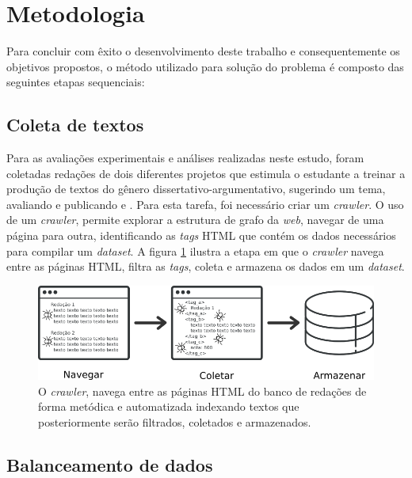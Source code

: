 \section{Metodologia}

Para concluir com êxito o desenvolvimento deste trabalho e consequentemente os 
objetivos propostos, o método utilizado para solução do problema é composto das 
seguintes etapas sequenciais:

\subsection{Coleta de textos}
\label{subsection:coleta_texto}

Para as avaliações experimentais e análises realizadas neste estudo, foram 
coletadas redações de dois diferentes projetos que estimula o estudante a 
treinar a produção de textos do gênero dissertativo-argumentativo, sugerindo 
um tema, avaliando e publicando \cite{brasil_escola} e \cite{uol:2017}. Para 
esta tarefa, foi necessário criar um \textit{crawler}. O uso de um 
\textit{crawler}, permite explorar a estrutura de grafo da \textit{web}, 
navegar de uma página para outra, identificando as \textit{tags} HTML que contém 
os dados necessários para compilar um \textit{dataset}. A figura 
\ref{figure:metodologia_1} ilustra a etapa em que o \textit{crawler} navega 
entre as páginas HTML, filtra as \textit{tags}, coleta e armazena os dados em 
um \textit{dataset}.

\begin{figure}[H]
\begin{center}
    \includegraphics[scale=0.60]{images/metodologia_1.png}
\end{center}
\caption{O \textit{crawler}, navega entre as páginas HTML do banco de redações 
de forma metódica e automatizada indexando textos que posteriormente serão 
filtrados, coletados e armazenados.}
\label{figure:metodologia_1}
\end{figure}

\subsection{Balanceamento de dados}
\label{subsection:balanceamento_dados}

